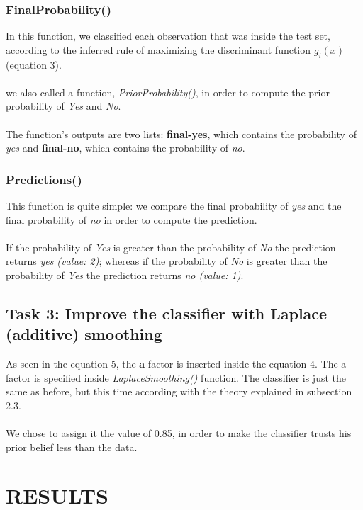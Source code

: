 \documentclass[10pt]{article}
\begin{document}
\subsubsection{FinalProbability()}
In this function, we  classified each observation that was inside the test set, according to the inferred rule
of maximizing the discriminant function $g_i(x)$ (equation 3).
\\\\
we also called a function, \textit{PriorProbability()}, in order to compute the prior probability of \textit{Yes} and \textit{No}.
\\\\
The function's outputs are two lists: \textbf{final-yes}, which contains the probability of \textit{yes} and \textbf{final-no}, which contains the probability of \textit{no}.

\subsubsection{Predictions()}
This function is quite simple: we compare the final probability of \textit{yes} and the final probability of \textit{no} in order to compute the prediction.
\\\\ 
If the probability of \textit{Yes} is greater than the probability of \textit{No} the prediction returns \textit{yes (value: 2)}; whereas if the probability of \textit{No} is greater than the probability of \textit{Yes} the prediction returns \textit{no (value: 1)}.


\subsection{Task 3: Improve the classifier with Laplace (additive) smoothing}
As seen in the equation 5, the \textbf{a} factor is inserted inside
the equation 4. The a factor is specified inside \textit{LaplaceSmoothing()} function. The classifier is just the same as before, but this time according with the theory explained in subsection 2.3.
\\\\ 
We chose to assign it the value of 0.85, in order to make the classifier trusts his prior belief less than
the data.

\section{RESULTS}
\end{document}
